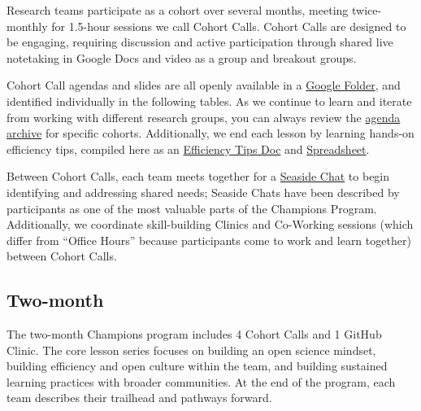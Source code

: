 \documentclass[
  letterpaper,
  DIV=11,
  numbers=noendperiod]{scrreprt}
\begin{document}
Research teams participate as a cohort over several months, meeting
twice-monthly for 1.5-hour sessions we call Cohort Calls. Cohort Calls
are designed to be engaging, requiring discussion and active
participation through shared live notetaking in Google Docs and video as
a group and breakout groups.

Cohort Call agendas and slides are all openly available in a
\href{https://drive.google.com/open?id=1HQHXlMVgg9lp2IYkzj8LSAG5bjyKFS6g}{Google
Folder}, and identified individually in the following tables. As we
continue to learn and iterate from working with different research
groups, you can always review the
\href{https://github.com/Openscapes/series/blob/master/agenda-archive.md}{agenda
archive} for specific cohorts. Additionally, we end each lesson by
learning hands-on efficiency tips, compiled here as an
\href{https://docs.google.com/document/d/e/2PACX-1vSABwrk4RgOa2XBv0ZVmQCEYtLmT-YOm7WHL0ba0eREcJ5G-uk4abqznKEX0YabHux48uVGxxAZXeJ4/pub}{Efficiency
Tips Doc} and
\href{https://docs.google.com/spreadsheets/d/e/2PACX-1vQqWV6qFUv6WOztKqj52gUfvVlYc5Emw6Z-YzoM5fr9uOHRDLTDC625pdKVe5PwhlRmZlklNB7Lulq4/pubhtml}{Spreadsheet}.

Between Cohort Calls, each team meets together for a
\href{https://www.openscapes.org/blog/2019/03/10/seaside-chats/}{Seaside
Chat} to begin identifying and addressing shared needs; Seaside Chats
have been described by participants as one of the most valuable parts of
the Champions Program. Additionally, we coordinate skill-building
Clinics and Co-Working sessions (which differ from ``Office Hours''
because participants come to work and learn together) between Cohort
Calls.

\hypertarget{two-month}{%
\subsection*{Two-month}\label{two-month}}

The two-month Champions program includes 4 Cohort Calls and 1 GitHub
Clinic. The core lesson series focuses on building an open science
mindset, building efficiency and open culture within the team, and
building sustained learning practices with broader communities. At the
end of the program, each team describes their trailhead and pathways
forward.
\end{document}
